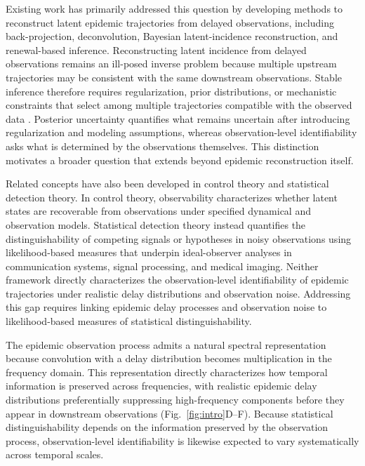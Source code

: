 Existing work has primarily addressed this question by developing methods to reconstruct latent epidemic trajectories from delayed observations, including back-projection\cite{becker1991method}, deconvolution\cite{goldstein2009reconstructing}, Bayesian latent-incidence reconstruction\cite{chitwood2022reconstructing}, and renewal-based inference\cite{cori2013new, gostic2020practical}. Reconstructing latent incidence from delayed observations remains an ill-posed inverse problem because multiple upstream trajectories may be consistent with the same downstream observations\cite{miller2022statistical}. Stable inference therefore requires regularization, prior distributions, or mechanistic constraints that select among multiple trajectories compatible with the observed data \cite{miller2022statistical, becker1991method, king2016statistical}. Posterior uncertainty quantifies what remains uncertain after introducing regularization and modeling assumptions, whereas observation-level identifiability asks what is determined by the observations themselves. This distinction motivates a broader question that extends beyond epidemic reconstruction itself.

Related concepts have also been developed in control theory and statistical detection theory. In control theory, observability characterizes whether latent states are recoverable from observations under specified dynamical and observation models\cite{kalman1960new,ljung1998system}. Statistical detection theory instead quantifies the distinguishability of competing signals or hypotheses in noisy observations using likelihood-based measures that underpin ideal-observer analyses in communication systems, signal processing, and medical imaging\cite{green1966signal,barrett2013foundations,barrett1998objective}. Neither framework directly characterizes the observation-level identifiability of epidemic trajectories under realistic delay distributions and observation noise. Addressing this gap requires linking epidemic delay processes and observation noise to likelihood-based measures of statistical distinguishability.

The epidemic observation process admits a natural spectral representation because convolution with a delay distribution becomes multiplication in the frequency domain\cite{oppenheim1999discrete,brigham1988fast}. This representation directly characterizes how temporal information is preserved across frequencies, with realistic epidemic delay distributions preferentially suppressing high-frequency components before they appear in downstream observations (Fig.~\ref{fig:intro}D–F)\cite{chitwood2022reconstructing,mcgough2020nowcasting}. Because statistical distinguishability depends on the information preserved by the observation process, observation-level identifiability is likewise expected to vary systematically across temporal scales. 

